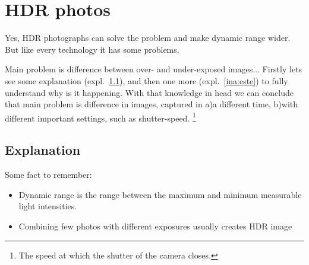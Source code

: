 \documentclass[10pt,twoside,english,a4paper]{article}
\begin{document}




\section{HDR photos} \label{ina}
Yes, HDR photographs can solve the problem and
make dynamic range wider. But like every technology
it has some problems.

Main problem is difference between over- and under-exposed images...
Firstly lets see some explanation (expl.~\ref{ina:nejake}),
and then one more (expl.~\ref{ina:este}) to fully understand
why is it happening.
\newline With that knowledge in head we can conclude that  main problem is
difference in images, captured in a)a different time, b)with different
important settings, such as shutter-speed.
\footnote{The speed at which
	the shutter of the camera closes.}



\subsection{Explanation} \label{ina:nejake}

Some fact to remember:
\begin{itemize}
	\item Dynamic range is the range between the maximum and minimum
	      measurable light intensities.
	\item Combining few photos with different exposures
	      usually creates HDR image

\end{itemize}


\end{document}
